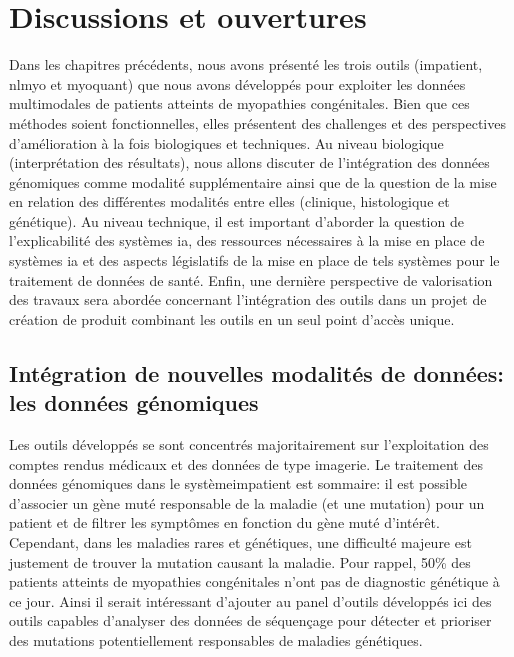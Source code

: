 \chapter{Discussions et ouvertures}
Dans les chapitres précédents, nous avons présenté les trois outils (\gls{impatient}, \gls{nlmyo} et \gls{myoquant}) que nous avons développés pour exploiter les données multimodales de patients atteints de myopathies congénitales. Bien que ces méthodes soient fonctionnelles, elles présentent des challenges et des perspectives d'amélioration à la fois biologiques et techniques. Au niveau biologique (interprétation des résultats), nous allons discuter de l'intégration des données génomiques comme modalité supplémentaire ainsi que de la question de la mise en relation des différentes modalités entre elles (clinique, histologique et génétique). Au niveau technique, il est important d'aborder la question de l'explicabilité des systèmes \gls{ia}, des ressources nécessaires à la mise en place de systèmes \gls{ia} et des aspects législatifs de la mise en place de tels systèmes pour le traitement de données de santé. Enfin, une dernière perspective de valorisation des travaux sera abordée concernant l'intégration des outils dans un projet de création de produit combinant les outils en un seul point d'accès unique.

\section{Intégration de nouvelles modalités de données: les données génomiques}
Les outils développés se sont concentrés majoritairement sur l'exploitation des comptes rendus médicaux et des données de type imagerie. Le traitement des données génomiques dans le système\gls{impatient} est sommaire: il est possible d'associer un gène muté responsable de la maladie (et une mutation) pour un patient et de filtrer les symptômes en fonction du gène muté d'intérêt. Cependant, dans les maladies rares et génétiques, une difficulté majeure est justement de trouver la mutation causant la maladie. Pour rappel, 50\% des patients atteints de myopathies congénitales n'ont pas de diagnostic génétique à ce jour. Ainsi il serait intéressant d'ajouter au panel d'outils développés ici des outils capables d'analyser des données de séquençage pour détecter et prioriser des mutations potentiellement responsables de maladies génétiques. 

